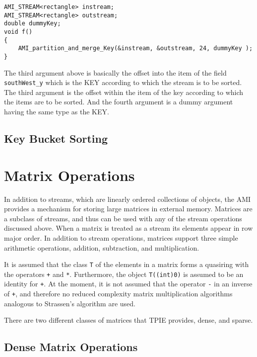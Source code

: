 \begin{verbatim}
AMI_STREAM<rectangle> instream;
AMI_STREAM<rectangle> outstream;
double dummyKey;
void f()
{
    AMI_partition_and_merge_Key(&instream, &outstream, 24, dummyKey );
}
\end{verbatim}

The third argument above is basically the offset into the item of the field
\verb|southWest_y| which is the KEY according to which the stream is to be sorted.
The third argument is the offset within the item of the key according to which the items are to
be sorted. And the fourth argument is a dummy argument having the same type as the
KEY.




\subsection{Key Bucket Sorting}
\label{sec:kb-sorting}


\section{Matrix Operations}
\label{sec:matrix}


In addition to streams, which are linearly ordered collections of
objects, the AMI provides a mechanism for storing large matrices in
external memory.  Matrices are a subclass of streams, and thus can be
used with any of the stream operations discussed above.  When a matrix
is treated as a stream its elements appear in row major order.  In
addition to stream operations, matrices support three simple
arithmetic operations, addition, subtraction, and multiplication.

It is assumed that the class \verb|T| of the elements in a matrix
forms a quasiring with the operators \verb|+| and \verb|*|.
Furthermore, the object \verb|T((int)0)| is assumed to be an identity
for \verb|+|.  At the moment, it is not assumed that the operator
\verb|-| in an inverse of \verb|+|, and therefore no reduced
complexity matrix multiplication algorithms analogous to Strassen's
algorithm are used.

There are two different classes of matrices that TPIE provides, dense,
and sparse.

\subsection{Dense Matrix Operations}
\label{sec:dense-mat}


